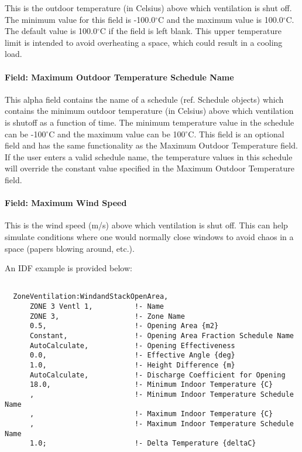 This is the outdoor temperature (in Celsius) above which ventilation is shut off. The minimum value for this field is -100.0$^\circ$C and the maximum value is 100.0$^\circ$C. The default value is 100.0$^\circ$C if the field is left blank. This upper temperature limit is intended to avoid overheating a space, which could result in a cooling load.

\paragraph{Field: Maximum Outdoor Temperature Schedule Name}\label{field-maximum-outdoor-temperature-schedule-name-1}

This alpha field contains the name of a schedule (ref. Schedule objects) which contains the minimum outdoor temperature (in Celsius) above which ventilation is shutoff as a function of time. The minimum temperature value in the schedule can be -100$^\circ$C and the maximum value can be 100$^\circ$C. This field is an optional field and has the same functionality as the Maximum Outdoor Temperature field. If the user enters a valid schedule name, the temperature values in this schedule will override the constant value specified in the Maximum Outdoor Temperature field.

\paragraph{Field: Maximum Wind Speed}\label{field-maximum-wind-speed-1}

This is the wind speed (m/s) above which ventilation is shut off. This can help simulate conditions where one would normally close windows to avoid chaos in a space (papers blowing around, etc.).

An IDF example is provided below:

\begin{lstlisting}

  ZoneVentilation:WindandStackOpenArea,
      ZONE 3 Ventl 1,          !- Name
      ZONE 3,                  !- Zone Name
      0.5,                     !- Opening Area {m2}
      Constant,                !- Opening Area Fraction Schedule Name
      AutoCalculate,           !- Opening Effectiveness
      0.0,                     !- Effective Angle {deg}
      1.0,                     !- Height Difference {m}
      AutoCalculate,           !- Discharge Coefficient for Opening
      18.0,                    !- Minimum Indoor Temperature {C}
      ,                        !- Minimum Indoor Temperature Schedule Name
      ,                        !- Maximum Indoor Temperature {C}
      ,                        !- Maximum Indoor Temperature Schedule Name
      1.0;                     !- Delta Temperature {deltaC}
\end{lstlisting}


